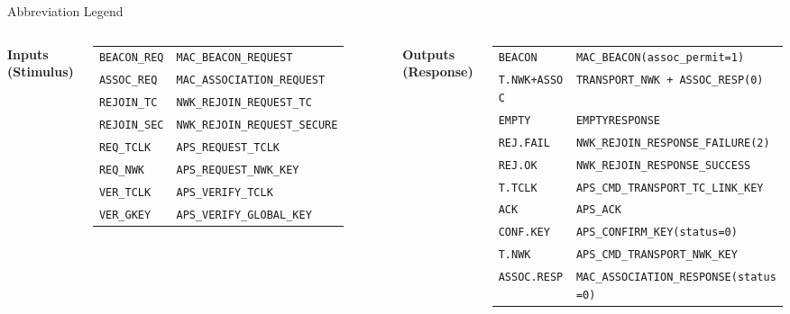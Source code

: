 \documentclass[aspectratio=169]{beamer}
\begin{document}
\begin{frame}{Abbreviation Legend}
\small
\begin{columns}[t]
  \textbf{Inputs (Stimulus)}\\[5pt]
  \begin{tabular}{@{}ll@{}}
    \texttt{BEACON\_REQ}  & \texttt{MAC\_BEACON\_REQUEST}           \\[2pt]
    \texttt{ASSOC\_REQ}   & \texttt{MAC\_ASSOCIATION\_REQUEST}      \\[2pt]
    \texttt{REJOIN\_TC}   & \texttt{NWK\_REJOIN\_REQUEST\_TC}       \\[2pt]
    \texttt{REJOIN\_SEC}  & \texttt{NWK\_REJOIN\_REQUEST\_SECURE}   \\[2pt]
    \texttt{REQ\_TCLK}    & \texttt{APS\_REQUEST\_TCLK}             \\[2pt]
    \texttt{REQ\_NWK}     & \texttt{APS\_REQUEST\_NWK\_KEY}         \\[2pt]
    \texttt{VER\_TCLK}    & \texttt{APS\_VERIFY\_TCLK}              \\[2pt]
    \texttt{VER\_GKEY}    & \texttt{APS\_VERIFY\_GLOBAL\_KEY}       \\
  \end{tabular}

  \textbf{Outputs (Response)}\\[5pt]
  \begin{tabular}{@{}ll@{}}
    \texttt{BEACON}       & \texttt{MAC\_BEACON(assoc\_permit=1)}             \\[2pt]
    \texttt{T.NWK+ASSOC}  & \texttt{TRANSPORT\_NWK + ASSOC\_RESP(0)}          \\[2pt]
    \texttt{EMPTY}        & \texttt{EMPTYRESPONSE}                             \\[2pt]
    \texttt{REJ.FAIL}     & \texttt{NWK\_REJOIN\_RESPONSE\_FAILURE(2)}         \\[2pt]
    \texttt{REJ.OK}       & \texttt{NWK\_REJOIN\_RESPONSE\_SUCCESS}            \\[2pt]
    \texttt{T.TCLK}       & \texttt{APS\_CMD\_TRANSPORT\_TC\_LINK\_KEY}        \\[2pt]
    \texttt{ACK}          & \texttt{APS\_ACK}                                  \\[2pt]
    \texttt{CONF.KEY}     & \texttt{APS\_CONFIRM\_KEY(status=0)}               \\[2pt]
    \texttt{T.NWK}        & \texttt{APS\_CMD\_TRANSPORT\_NWK\_KEY}             \\[2pt]
    \texttt{ASSOC.RESP}   & \texttt{MAC\_ASSOCIATION\_RESPONSE(status=0)}      \\
  \end{tabular}
\end{columns}
\end{frame}
\end{document}
